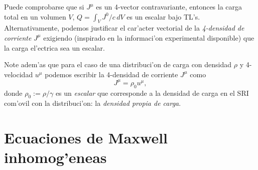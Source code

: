 Puede comprobarse que si $J^\mu$ es un 4-vector
contravariante, entonces la carga total en un volumen $V$, $Q=\int_V J^0/c\,dV$ es un escalar bajo TL's. Alternativamente, podemos justificar el car'acter
vectorial de la \textit{4-densidad de corriente} $J^\mu$ exigiendo (inspirado en
la informaci'on experimental disponible) que la carga el'ectrica sea un escalar.

Note adem'as que para el caso de una distribuci'on de carga con densidad $\rho$
y 4-velocidad $u^\mu$ podemos escribir la 4-densidad de corriente $J^\mu$ como
\begin{equation}
\boxed{J^\mu=\rho_0 u^\mu,}
\end{equation}
donde $\rho_0:={\rho}/{\gamma}$ es un \textit{escalar} que corresponde a la densidad de carga en el SRI com'ovil con la distribuci'on: la \textit{densidad propia de carga}.


\section{Ecuaciones de Maxwell inhomog'eneas}

